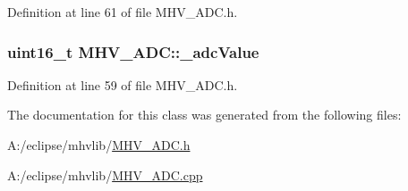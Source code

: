 \-Definition at line 61 of file \-M\-H\-V\-\_\-\-A\-D\-C.\-h.

\hypertarget{class_m_h_v___a_d_c_a5b4912e06e7c9c39637fa1d4f3e00ef7}{
\subsubsection[{\-\_\-adc\-Value}]{\setlength{\rightskip}{0pt plus 5cm}uint16\-\_\-t {\bf \-M\-H\-V\-\_\-\-A\-D\-C\-::\-\_\-adc\-Value}}}
\label{class_m_h_v___a_d_c_a5b4912e06e7c9c39637fa1d4f3e00ef7}


\-Definition at line 59 of file \-M\-H\-V\-\_\-\-A\-D\-C.\-h.



\-The documentation for this class was generated from the following files\-:\begin{DoxyCompactItemize}
\item 
\-A\-:/eclipse/mhvlib/\hyperlink{_m_h_v___a_d_c_8h}{\-M\-H\-V\-\_\-\-A\-D\-C.\-h}\item 
\-A\-:/eclipse/mhvlib/\hyperlink{_m_h_v___a_d_c_8cpp}{\-M\-H\-V\-\_\-\-A\-D\-C.\-cpp}\end{DoxyCompactItemize}
